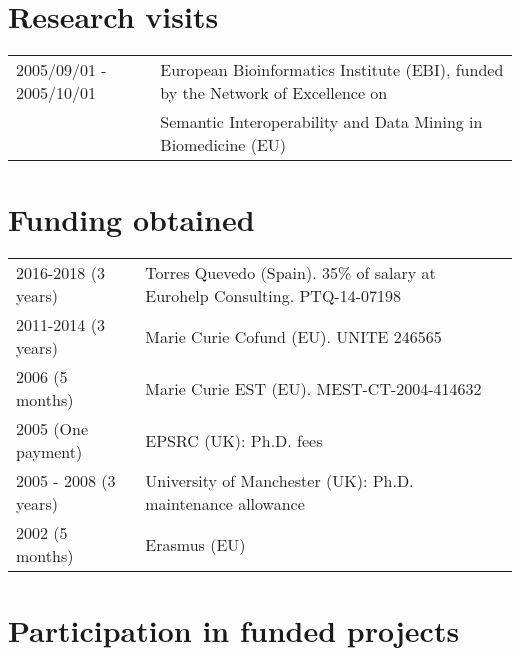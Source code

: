 \documentclass[11pt,fullpage]{article}
\begin{document}
\section*{Research visits}

\begin{tabular}{ll}
 2005/09/01 - 2005/10/01 & European Bioinformatics Institute (EBI), funded by the Network of Excellence on \\
      & Semantic Interoperability and Data Mining in Biomedicine (EU)

\end{tabular}

\section*{Funding obtained}

\begin{tabular}{ll}
        2016-2018 (3 years) & Torres Quevedo (Spain). 35\% of salary at Eurohelp Consulting. PTQ-14-07198 \\
	2011-2014 (3 years) & Marie Curie Cofund (EU). UNITE 246565 \\
	2006 (5 months) & Marie Curie EST (EU). MEST-CT-2004-414632 \\
	2005 (One payment) & EPSRC (UK): Ph.D. fees \\
	2005 - 2008 (3 years) & University of Manchester (UK): Ph.D. maintenance allowance \\
	2002 (5 months) & Erasmus (EU) \\
\end{tabular}

\section*{Participation in funded projects}
\end{document}
